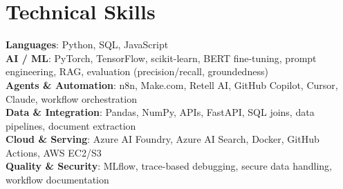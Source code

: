 \documentclass[letterpaper,11pt]{article}
\begin{document}
\section{Technical Skills}
 \begin{itemize}[leftmargin=0.15in, label={}]
    \small{\item{
     \textbf{Languages}{: Python, SQL, JavaScript} \\
     \textbf{AI / ML}{: PyTorch, TensorFlow, scikit-learn, BERT fine-tuning, prompt engineering, RAG, evaluation (precision/recall, groundedness)} \\
     \textbf{Agents \& Automation}{: n8n, Make.com, Retell AI, GitHub Copilot, Cursor, Claude, workflow orchestration} \\
     \textbf{Data \& Integration}{: Pandas, NumPy, APIs, FastAPI, SQL joins, data pipelines, document extraction} \\
     \textbf{Cloud \& Serving}{: Azure AI Foundry, Azure AI Search, Docker, GitHub Actions, AWS EC2/S3} \\
     \textbf{Quality \& Security}{: MLflow, trace-based debugging, secure data handling, workflow documentation}
    }}
 \end{itemize}
\end{document}
